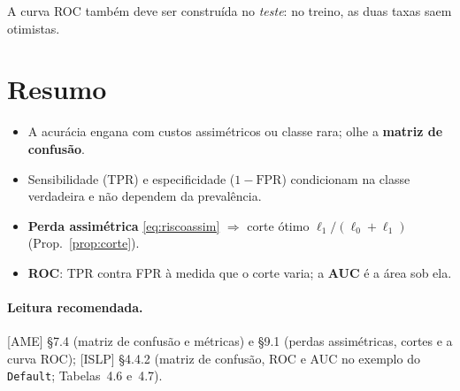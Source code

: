 \documentclass[11pt,a4paper]{article}
\begin{document}
\begin{atencao}
A curva ROC também deve ser construída no \emph{teste}: no treino, as duas taxas saem
otimistas.
\end{atencao}

\section*{Resumo}
\begin{itemize}[leftmargin=1.4cm]
  \item A acurácia engana com custos assimétricos ou classe rara; olhe a
        \textbf{matriz de confusão}.
  \item Sensibilidade (TPR) e especificidade ($1-\text{FPR}$) condicionam na classe
        verdadeira e não dependem da prevalência.
  \item \textbf{Perda assimétrica} \eqref{eq:riscoassim} $\Rightarrow$ corte ótimo
        $\ell_1/(\ell_0+\ell_1)$ (Prop.~\ref{prop:corte}).
  \item \textbf{ROC}: TPR contra FPR à medida que o corte varia; a \textbf{AUC} é a
        área sob ela.
\end{itemize}

\paragraph{Leitura recomendada.} [AME] §7.4 (matriz de confusão e métricas) e §9.1
(perdas assimétricas, cortes e a curva ROC); [ISLP] §4.4.2 (matriz de confusão, ROC
e AUC no exemplo do \texttt{Default}; Tabelas~4.6 e~4.7).
\end{document}
